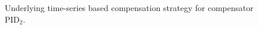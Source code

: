 \begin{figure}
\begin{tikzpicture}[node distance=2cm, shorten >= 1pt, >=stealth', auto, scale=1.0, transform shape]
\end{tikzpicture}
\caption{Underlying time-series based compensation strategy for compensator PID$_2$.}
\label{ch2:fig:power-transient-minimisation}
\end{figure}
